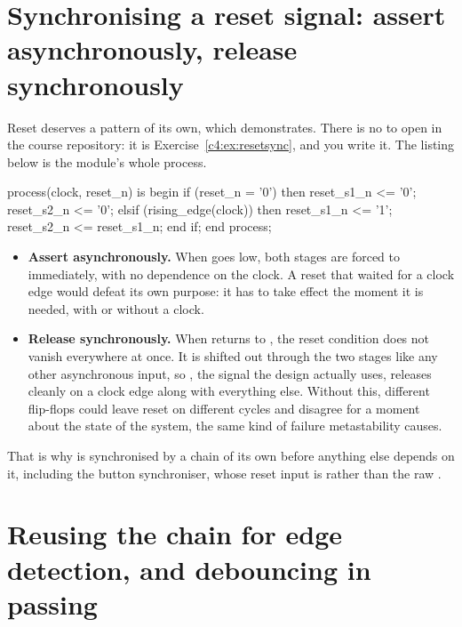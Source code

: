 \section{Synchronising a reset signal: assert asynchronously, release synchronously}
\label{c4:sec:resetsync}

Reset deserves a pattern of its own, which  demonstrates. There is no
 to open in the course repository: it is Exercise~\ref{c4:ex:resetsync}, and
you write it. The listing below is the module's whole process.

\begin{vhdlcode}
process(clock, reset_n) is
begin
    if (reset_n = '0') then
        reset_s1_n <= '0';
        reset_s2_n <= '0';
    elsif (rising_edge(clock)) then
        reset_s1_n <= '1';
        reset_s2_n <= reset_s1_n;
    end if;
end process;
\end{vhdlcode}

\begin{itemize}
  \item \textbf{Assert asynchronously.} When  goes low, both stages are forced to
     immediately, with no dependence on the clock. A reset that waited for a clock edge
    would defeat its own purpose: it has to take effect the moment it is needed, with or without a
    clock.
  \item \textbf{Release synchronously.} When  returns to , the reset
    condition does not vanish everywhere at once. It is shifted out through the two stages like any
    other asynchronous input, so , the signal the design actually uses, releases
    cleanly on a clock edge along with everything else. Without this, different flip-flops could
    leave reset on different cycles and disagree for a moment about the state of the system, the
    same kind of failure metastability causes.
\end{itemize}

That is why  is synchronised by a chain of its own before anything else depends on
it, including the button synchroniser, whose reset input is  rather than the raw
.

\section{Reusing the chain for edge detection, and debouncing in passing}
\label{c4:sec:buttonsync}


